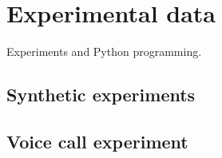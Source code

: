 \chapter{Experimental data}
\label{chap:expe}

Experiments and Python programming.

\section{Synthetic experiments}
\label{sec:synexp}


\section{Voice call experiment}
\label{sec:voicecall}

